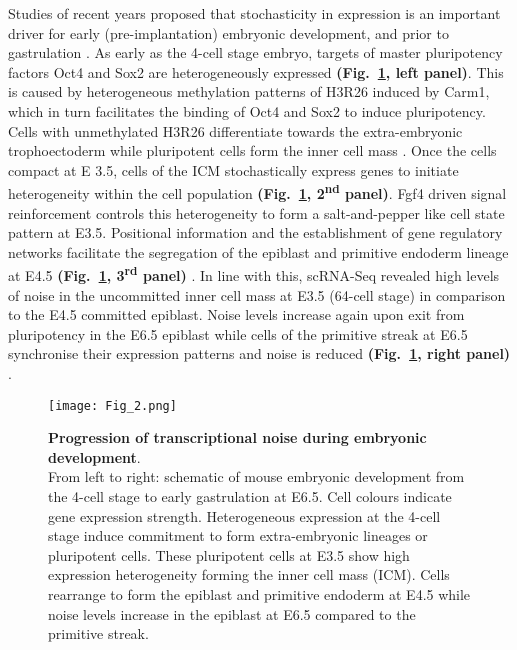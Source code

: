 Studies of recent years proposed that stochasticity in expression is an important driver for early (pre-implantation) embryonic development, and prior to gastrulation \citep{Dietrich2007}. As early as the 4-cell stage embryo, targets of master pluripotency factors \gls{Oct4} and \gls{Sox2} are heterogeneously expressed \textbf{(Fig.~\ref{fig0:noise_development}, left panel)}. This is caused by heterogeneous methylation patterns of \gls{H3R26} induced by \gls{Carm1}, which in turn facilitates the binding of Oct4 and Sox2 to induce pluripotency. Cells with unmethylated H3R26 differentiate towards the extra-embryonic trophoectoderm while pluripotent cells form the inner cell mass \citep{Goolam2016}. Once the cells compact at \gls{E} 3.5, cells of the \gls{ICM} stochastically express genes to initiate heterogeneity within the cell population \textbf{(Fig.~\ref{fig0:noise_development}, 2\textsuperscript{nd} panel)}. Fgf4 driven signal reinforcement controls this heterogeneity to form a salt-and-pepper like cell state pattern at E3.5. Positional information and the establishment of gene regulatory networks facilitate the segregation of the epiblast and primitive endoderm lineage at E4.5 \textbf{(Fig.~\ref{fig0:noise_development}, 3\textsuperscript{rd} panel)} \citep{Ohnishi2014}. In line with this, scRNA-Seq revealed high levels of noise in the uncommitted inner cell mass at E3.5 (64-cell stage) in comparison to the E4.5 committed epiblast. Noise levels increase again upon exit from pluripotency in the E6.5 epiblast while cells of the primitive streak at E6.5 synchronise their expression patterns and noise is reduced \textbf{(Fig.~\ref{fig0:noise_development}, right panel)} \citep{Mohammed2017}.

\begin{figure}[!h]
\centering
\texttt{[image: Fig\_2.png]}
\caption[Progression of transcriptional heterogeneity during embryonic development]{\textbf{Progression of transcriptional noise during embryonic development}.\\
From left to right: schematic of mouse embryonic development from the 4-cell stage to early gastrulation at E6.5. Cell colours indicate gene expression strength. Heterogeneous expression at the 4-cell stage induce commitment to form extra-embryonic lineages or pluripotent cells. These pluripotent cells at E3.5 show high expression heterogeneity forming the inner cell mass (ICM). Cells rearrange to form the epiblast and primitive endoderm at E4.5 while noise levels increase in the epiblast at E6.5 compared to the primitive streak.}
\label{fig0:noise_development}
\end{figure}

